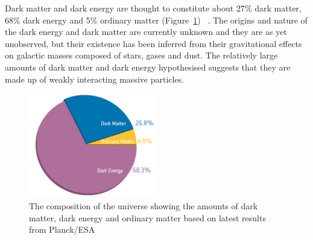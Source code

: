 Dark matter and dark energy are thought to constitute about 27\% dark matter, 68\% dark energy and 5\%
ordinary matter (Figure~\ref{fig:universe_composition}) ~\cite{Ade:2013sjv}. The origins and nature of the
dark energy and dark matter are currently unknown and they are as yet unobserved, but their existence has been
inferred from their gravitational effects on galactic masses composed of stars, gases and dust. The relatively
large amounts of dark matter and dark energy hypothesised suggests that they are made up of weakly interacting
massive particles.

\begin{figure}[hbtp]
   \centering
     \includegraphics[width=0.5\textwidth]{Chapters/03_Theory/Images/planck_cosmic_pie}\hfill
     \caption{The composition of the universe showing the amounts of dark matter, dark energy and ordinary
     matter based on latest results from Planck/ESA~\cite{Ade:2013sjv}}
     \label{fig:universe_composition}
\end{figure}